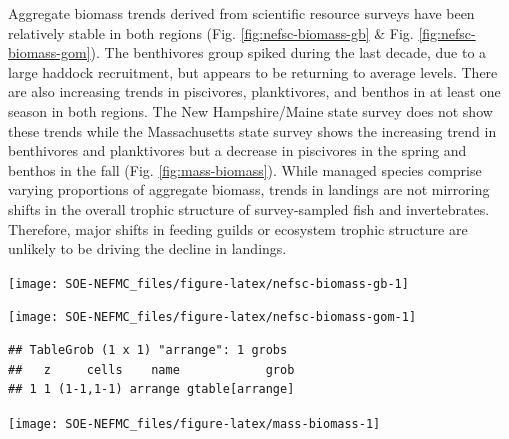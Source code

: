 \documentclass[
  10pt,
]{article}
\let\origfigure\figure
\let\endorigfigure\endfigure
\renewenvironment{figure}[1][2] {
    \expandafter\origfigure\expandafter[H]
} {
    \endorigfigure
}
\begin{document}
Aggregate biomass trends derived from scientific resource surveys have been relatively stable in both regions (Fig. \ref{fig:nefsc-biomass-gb} \& Fig. \ref{fig:nefsc-biomass-gom}). The benthivores group spiked during the last decade, due to a large haddock recruitment, but appears to be returning to average levels. There are also increasing trends in piscivores, planktivores, and benthos in at least one season in both regions. The New Hampshire/Maine state survey does not show these trends while the Massachusetts state survey shows the increasing trend in benthivores and planktivores but a decrease in piscivores in the spring and benthos in the fall (Fig. \ref{fig:mass-biomass}). While managed species comprise varying proportions of aggregate biomass, trends in landings are not mirroring shifts in the overall trophic structure of survey-sampled fish and invertebrates. Therefore, major shifts in feeding guilds or ecosystem trophic structure are unlikely to be driving the decline in landings.

\begin{figure}

{\centering \texttt{[image: SOE-NEFMC\_files/figure-latex/nefsc-biomass-gb-1]} 

}

\caption{Spring (left) and fall (right) surveyed biomass on Georges Bank. The shaded area around each annual mean represents 2 standard deviations from the mean.}\label{fig:nefsc-biomass-gb}
\end{figure}

\begin{figure}

{\centering \texttt{[image: SOE-NEFMC\_files/figure-latex/nefsc-biomass-gom-1]} 

}

\caption{Spring (left) and fall (right) surveyed biomass in the Gulf of Maine. The shaded area around each annual mean represents 2 standard deviations from the mean.}\label{fig:nefsc-biomass-gom}
\end{figure}

\begin{verbatim}
## TableGrob (1 x 1) "arrange": 1 grobs
##   z     cells    name            grob
## 1 1 (1-1,1-1) arrange gtable[arrange]
\end{verbatim}

\begin{figure}

{\centering \texttt{[image: SOE-NEFMC\_files/figure-latex/mass-biomass-1]} 

}

\caption{Spring (left) and fall (right) surveyed biomass from the state of Massachusetts inshore survey. The shaded area around each annual mean represents 2 standard deviations from the mean.}\label{fig:mass-biomass}
\end{figure}
\end{document}
